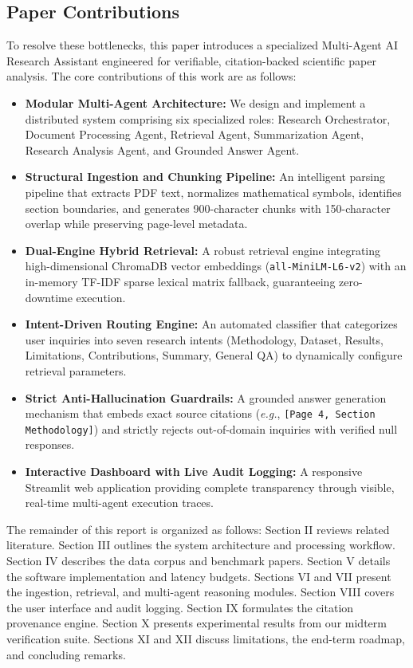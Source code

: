 \documentclass[conference]{IEEEtran}
\begin{document}
\subsection{Paper Contributions}
To resolve these bottlenecks, this paper introduces a specialized Multi-Agent AI Research Assistant engineered for verifiable, citation-backed scientific paper analysis. The core contributions of this work are as follows:
\begin{itemize}
    \item \textbf{Modular Multi-Agent Architecture:} We design and implement a distributed system comprising six specialized roles: Research Orchestrator, Document Processing Agent, Retrieval Agent, Summarization Agent, Research Analysis Agent, and Grounded Answer Agent.
    \item \textbf{Structural Ingestion and Chunking Pipeline:} An intelligent parsing pipeline that extracts PDF text, normalizes mathematical symbols, identifies section boundaries, and generates 900-character chunks with 150-character overlap while preserving page-level metadata.
    \item \textbf{Dual-Engine Hybrid Retrieval:} A robust retrieval engine integrating high-dimensional ChromaDB vector embeddings (\texttt{all-MiniLM-L6-v2}) with an in-memory TF-IDF sparse lexical matrix fallback, guaranteeing zero-downtime execution.
    \item \textbf{Intent-Driven Routing Engine:} An automated classifier that categorizes user inquiries into seven research intents (Methodology, Dataset, Results, Limitations, Contributions, Summary, General QA) to dynamically configure retrieval parameters.
    \item \textbf{Strict Anti-Hallucination Guardrails:} A grounded answer generation mechanism that embeds exact source citations (\textit{e.g.}, \texttt{[Page 4, Section Methodology]}) and strictly rejects out-of-domain inquiries with verified null responses.
    \item \textbf{Interactive Dashboard with Live Audit Logging:} A responsive Streamlit web application providing complete transparency through visible, real-time multi-agent execution traces.
\end{itemize}

The remainder of this report is organized as follows: Section II reviews related literature. Section III outlines the system architecture and processing workflow. Section IV describes the data corpus and benchmark papers. Section V details the software implementation and latency budgets. Sections VI and VII present the ingestion, retrieval, and multi-agent reasoning modules. Section VIII covers the user interface and audit logging. Section IX formulates the citation provenance engine. Section X presents experimental results from our midterm verification suite. Sections XI and XII discuss limitations, the end-term roadmap, and concluding remarks.
\end{document}
